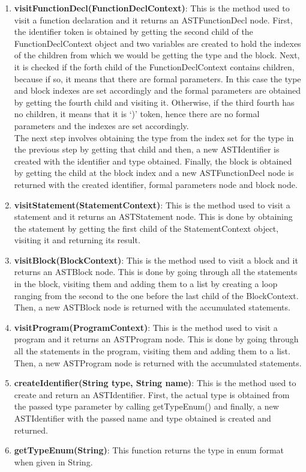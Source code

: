 \documentclass{article}
\begin{document}
\begin{enumerate}
				
				\item \textbf{visitFunctionDecl(FunctionDeclContext)}:  This is the method used to visit a function declaration and it returns an ASTFunctionDecl node. First, the identifier token is obtained by getting the second child of the FunctionDeclContext object and two variables are created to hold the indexes of the children from which we would be getting the type and the block. Next, it is checked if the forth child of the FunctionDeclContext contains children, because if so, it means that there are formal parameters. In this case the type and block indexes are set accordingly and the formal parameters are obtained by getting the fourth child and visiting it. Otherwise, if the third fourth has no children, it means that it is `)' token, hence there are no formal parameters and the indexes are set accordingly.\\
				
				The next step involves obtaining the type from the index set for the type in the previous step by getting that child and then, a new ASTIdentifier is created with the identifier and type obtained. Finally, the block is obtained by getting the child at the block index and a new ASTFunctionDecl node is returned with the created identifier, formal parameters node and block node.
				
				\item \textbf{visitStatement(StatementContext)}:  This is the method used to visit a statement and it returns an ASTStatement node. This is done by obtaining the statement by getting the first child of the StatementContext object, visiting it and returning its result.
				
				\item \textbf{visitBlock(BlockContext)}:  This is the method used to visit a block and it returns an ASTBlock node. This is done by going through all the statements in the block, visiting them and adding them to a list by creating a loop ranging from the second to the one before the last child of the BlockContext. Then, a new ASTBlock node is returned with the accumulated statements.
				
				\item \textbf{visitProgram(ProgramContext)}:  This is the method used to visit a program and it returns an ASTProgram node. This is done by going through all the statements in the program, visiting them and adding them to a list. Then, a new ASTProgram node is returned with the accumulated statements.
				
				\item \textbf{createIdentifier(String type, String name)}:  This is the method used to create and return an ASTIdentifier. First, the actual type is obtained from the passed type parameter by calling getTypeEnum() and finally, a new ASTIdentifier with the passed name and type obtained is created and returned.
				
				\item \textbf{getTypeEnum(String)}: This function returns the type in enum format when given in String.
				
				
				\end{enumerate}
				
\end{document}
